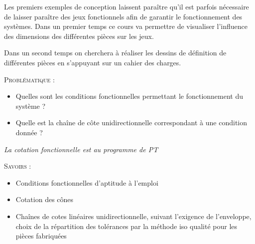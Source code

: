 \documentclass[11pt,oneside]{article}
\begin{document}








Les premiers exemples de conception laissent paraître qu'il est parfois nécessaire de laisser paraître des jeux fonctionnels afin de garantir le fonctionnement des systèmes. Dans un premier temps ce cours va permettre de visualiser l'influence des dimensions des différentes pièces sur les jeux. 

Dans un second temps on cherchera à réaliser les dessins de définition de différentes pièces en s'appuyant sur un cahier des charges. 

\begin{prob}
\textsc{Problématique :}
\begin{itemize}
\item Quelles sont les conditions fonctionnelles permettant le fonctionnement du système ?
\item Quelle est la chaîne de côte unidirectionnelle correspondant à une condition donnée ?
\end{itemize}
\end{prob}



\begin{savoir}
\textit{La cotation fonctionnelle est au programme de PT}

\textsc{Savoirs :}
\begin{itemize}
\item Conditions fonctionnelles d'aptitude à l'emploi
\item Cotation des cônes
\item Chaînes de cotes linéaires unidirectionnelle, suivant l'exigence de l'enveloppe, choix de la répartition des tolérances par la méthode iso qualité pour les pièces fabriquées
\end{itemize}
\end{savoir}
 
\end{document}
